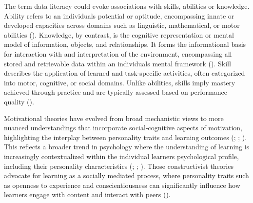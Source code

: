 \documentclass[
  12pt,
  a4paper,
  twoside]{article}
\begin{document}
The term data literacy could evoke associations with skills, abilities or knowledge.
Ability refers to an individuals potential or aptitude, encompassing innate or developed capacities across domains such as linguistic, mathematical, or motor abilities ().
Knowledge, by contrast, is the cognitive representation or mental model of information, objects, and relationships. It forms the informational basis for interaction with and interpretation of the environment, encompassing all stored and retrievable data within an individuals mental framework ().
Skill describes the application of learned and task-specific activities, often categorized into motor, cognitive, or social domains. Unlike abilities, skills imply mastery achieved through practice and are typically assessed based on performance quality ().

Motivational theories have evolved from broad mechanistic views to more nuanced understandings that incorporate social-cognitive aspects of motivation, highlighting the interplay between personality traits and learning outcomes (; ; ). This reflects a broader trend in psychology where the understanding of learning is increasingly contextualized within the individual learners psychological profile, including their personality characteristics (; ; ).
Those constructivist theories advocate for learning as a socially mediated process, where personality traits such as openness to experience and conscientiousness can significantly influence how learners engage with content and interact with peers ().
\end{document}

